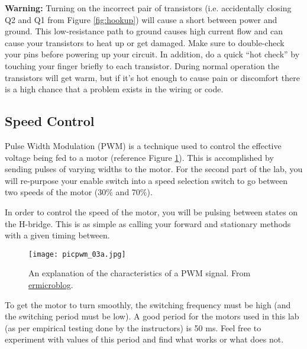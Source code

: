 \documentclass{article}
\begin{document}
\textbf{Warning:} Turning on the incorrect pair of transistors (i.e. accidentally closing Q2 and Q1 from Figure \ref{fig:hookup}) will cause a short between power and ground. This low-resistance path to ground causes high current flow and can cause your transistors to heat up or get damaged. Make sure to double-check your pins before powering up your circuit. In addition, do a quick “hot check” by touching your finger briefly to each transistor. During normal operation the transistors will get warm, but if it’s hot enough to cause pain or discomfort there is a high chance that a problem exists in the wiring or code.

\subsection{Speed Control}
Pulse Width Modulation (PWM) is a technique used to control the effective voltage being fed to a motor (reference Figure \ref{fig:pwm}). This is accomplished by sending pulses of varying widths to the motor. For the second part of the lab, you will re-purpose your enable switch into a speed selection switch to go between two speeds of the motor (30\% and 70\%). 

In order to control the speed of the motor, you will be pulsing between states on the H-bridge. This is as simple as calling your forward and stationary methods with a given timing between. 

\begin{figure}[ht]
	\center
	\texttt{[image: picpwm\_03a.jpg]}
	\caption{An explanation of the characteristics of a PWM signal. From \href{http://www.ermicro.com/blog/}{ermicroblog}.}
	\label{fig:pwm}
\end{figure}

To get the motor to turn smoothly, the switching frequency must be high (and the switching period must be low). A good period for the motors used in this lab (as per empirical testing done by the instructors) is 50 ms. Feel free to experiment with values of this period and find what works or what does not. 
\end{document}
